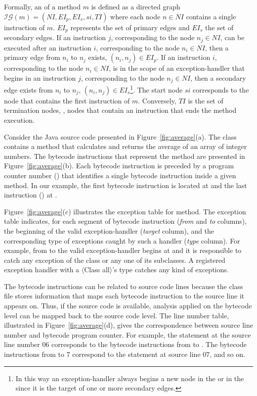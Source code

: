 Formally, an \IG of a method $m$ is defined as a directed graph
$\mathcal{IG}(m) = (NI, EI_p, EI_s, si, TI)$ where each node $n
\in NI$ contains a single instruction of $m$. $EI_p$ represents
the set of primary edges and $EI_s$ the set of secondary edges. If
an instruction $j$, corresponding to the node $n_j \in NI$, can be
executed after an instruction $i$, corresponding to the node $n_i
\in NI$, then a primary edge from $n_i$ to $n_j$ exists,
$(n_i,n_j) \in EI_p$. If an instruction $i$, corresponding to the
node $n_i \in NI$, is in the scope of an exception-handler that
begins in an instruction $j$, corresponding to the node $n_j \in
NI$, then a secondary edge exists from $n_i$ to $n_j$, $(n_i,n_j)
\in EI_s$\footnote{In this way an exception-handler always
    begins a new node in the \IG or in the \BG since it
    is the target of one or more secondary edges.}.
The start node $si$ corresponds to the node that contains the
first instruction of $m$. Conversely, $TI$ is the set of
termination nodes, \ie, nodes that contain an instruction that
ends the method execution.

Consider the Java source code presented in
Figure~\ref{fig:average}(a). The class  contains a method
 that calculates and returns the average of an
array of integer numbers. The bytecode instructions that represent
the  method are presented in
Figure~\ref{fig:average}(b). Each bytecode instruction is preceded
by a program counter number (\pc) that identifies a single
bytecode instruction inside a given method. In our example, the
first bytecode instruction  is located at  and
the last instruction () at .

Figure~\ref{fig:average}(c) illustrates the exception table for
 method. The exception table indicates, for each
segment of bytecode instruction (\emph{from} and \emph{to}
columns), the beginning of the valid exception-handler
(\emph{target} column), and the corresponding type of exceptions
caught by such a handler (\emph{type} column). For example, from
 to  the valid exception-handler begins at  and
it is responsible to catch any exception of the class
 or any one of its subclasses. A
registered exception handler with a $\langle$\textsf{Class
all}$\rangle$'s type catches any kind of exceptions.



The bytecode instructions can be related to source code lines
because the class file stores information that maps each bytecode
instruction to the source line it appears on. Thus, if the source
code is available, analysis applied on the bytecode level can be
mapped back to the source code level. The line number table,
illustrated in Figure~\ref{fig:average}(d), gives the
correspondence between source line number and bytecode program
counter. For example, the statement at the source line number 06
corresponds to the bytecode instructions from  to . The
bytecode instructions from  to 7 correspond to the statement
at source line 07, and so on.

